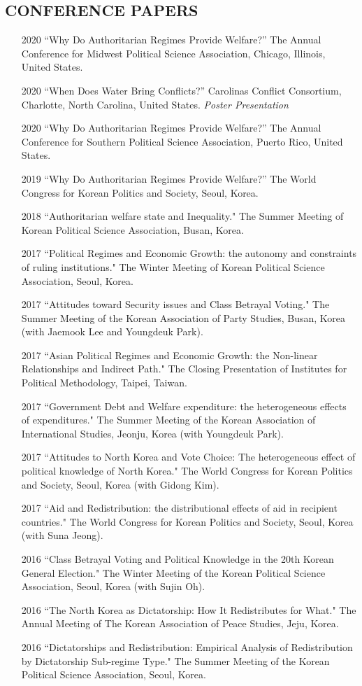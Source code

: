 \documentclass[11pt]{res} %
\begin{document}
\begin{resume}
\section{CONFERENCE PAPERS}
\begin{itemize}
	\item[2020] ``Why Do Authoritarian Regimes Provide Welfare?'' The Annual Conference for Midwest Political Science Association, Chicago, Illinois, United States.
	\item[2020] ``When Does Water Bring Conflicts?'' Carolinas Conflict Consortium, Charlotte, North Carolina, United States. \textit{Poster Presentation}
	\item[2020] ``Why Do Authoritarian Regimes Provide Welfare?'' The Annual Conference for Southern Political Science Association, Puerto Rico, United States.
	\item[2019] ``Why Do Authoritarian Regimes Provide Welfare?'' The World Congress for Korean Politics and Society, Seoul, Korea.
	\item[2018] ``Authoritarian welfare state and Inequality." The Summer Meeting of Korean Political Science Association, Busan, Korea.
	\item[2017] ``Political Regimes and Economic Growth: the autonomy and constraints of ruling institutions." The Winter Meeting of Korean Political Science Association, Seoul, Korea.
	\item[2017] ``Attitudes toward Security issues and Class Betrayal Voting." The Summer Meeting of the Korean Association of Party Studies, Busan, Korea (with Jaemook Lee and Youngdeuk Park).
	\item[2017] ``Asian Political Regimes and Economic Growth: the Non-linear Relationships and Indirect Path." The Closing Presentation of Institutes for Political Methodology, Taipei, Taiwan.
	\item[2017] ``Government Debt and Welfare expenditure: the heterogeneous effects of expenditures." The Summer Meeting of the Korean Association of International Studies, Jeonju, Korea (with Youngdeuk Park).
	\item[2017] ``Attitudes to North Korea and Vote Choice: The heterogeneous effect of political knowledge of North Korea." The World Congress for Korean Politics and Society, Seoul, Korea (with Gidong Kim).
	\item[2017] ``Aid and Redistribution: the distributional effects of aid in recipient countries." The World Congress for Korean Politics and Society, Seoul, Korea (with Suna Jeong).
	\item[2016] ``Class Betrayal Voting and Political Knowledge in the 20th Korean General Election." The Winter Meeting of the Korean Political Science Association, Seoul, Korea (with Sujin Oh).
	\item[2016] ``The North Korea as Dictatorship: How It Redistributes for What." The Annual Meeting of The Korean Association of Peace Studies, Jeju, Korea.
	\item[2016] ``Dictatorships and Redistribution: Empirical Analysis of Redistribution by Dictatorship Sub-regime Type." The Summer Meeting of the Korean Political Science Association, Seoul, Korea.
\end{itemize}


\end{resume}
\end{document}
